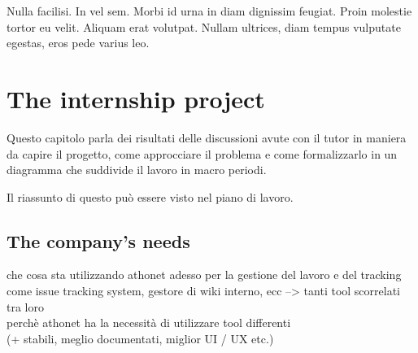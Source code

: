 \begin{savequote}[75mm]
Nulla facilisi. In vel sem. Morbi id urna in diam dignissim feugiat. Proin molestie tortor eu velit. Aliquam erat volutpat. Nullam ultrices, diam tempus vulputate egestas, eros pede varius leo.
\end{savequote}

\chapter{The internship project}



Questo capitolo parla dei risultati delle discussioni avute con il tutor in maniera da capire il progetto, come approcciare il problema e come formalizzarlo in un diagramma che suddivide il lavoro in macro periodi.

Il riassunto di questo può essere visto nel piano di lavoro.

\section{The company's needs}
che cosa sta utilizzando athonet adesso per la gestione del lavoro e del tracking\\
come issue tracking system, gestore di wiki interno, ecc --> tanti tool scorrelati tra loro\\
perchè athonet ha la necessità di utilizzare tool differenti \\
(+ stabili, meglio documentati, miglior UI / UX etc.)

